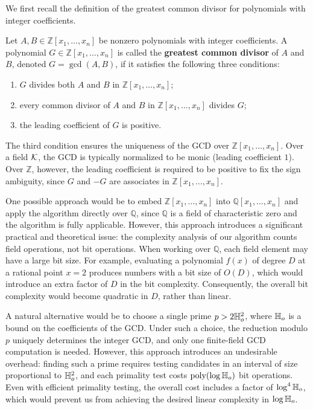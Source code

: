 \documentclass{article}
\numberwithin{equation}{section}
\begin{document}
We first recall the definition of the greatest common divisor for polynomials with integer coefficients.

\begin{definition}
Let $A, B \in \mathbb{Z}[x_1,\dots,x_n]$ be nonzero polynomials with integer coefficients. A polynomial $G \in \mathbb{Z}[x_1,\dots,x_n]$ is called the \textbf{greatest common divisor} of $A$ and $B$, denoted $G = \gcd(A,B)$, if it satisfies the following three conditions:

\begin{enumerate}
    \item $G$ divides both $A$ and $B$ in $\mathbb{Z}[x_1,\dots,x_n]$;
    \item every common divisor of $A$ and $B$ in $\mathbb{Z}[x_1,\dots,x_n]$ divides $G$;
    \item the leading coefficient of $G$ is positive.
\end{enumerate}
\end{definition}

\begin{remark}
The third condition ensures the uniqueness of the GCD over $\mathbb{Z}[x_1,\dots,x_n]$. Over a field ${\mathcal{K}}$, the GCD is typically normalized to be monic (leading coefficient $1$). Over $\mathbb{Z}$, however, the leading coefficient is required to be positive to fix the sign ambiguity, since $G$ and $-G$ are associates in $\mathbb{Z}[x_1,\dots,x_n]$.
\end{remark}

One possible approach would be to embed $\mathbb{Z}[x_1,\dots,x_n]$ into $\mathbb{Q}[x_1,\dots,x_n]$ and apply the algorithm directly over $\mathbb{Q}$, since $\mathbb{Q}$ is a field of characteristic zero and the algorithm is fully applicable. However, this approach introduces a significant practical and theoretical issue: the complexity analysis of our algorithm counts field operations, not bit operations. When working over $\mathbb{Q}$, each field element may have a large bit size. For example, evaluating a polynomial $f(x)$ of degree $D$ at a rational point $x = 2$ produces numbers with a bit size of $O(D)$, which would introduce an extra factor of $D$ in the bit complexity. Consequently, the overall bit complexity would become quadratic in $D$, rather than linear.




A natural alternative would be to choose a single prime \(p > 2\mathbb{H}_{o}^2\), where \(\mathbb{H}_{o}\) is a bound on the
coefficients of the GCD. Under such a choice, the reduction modulo \(p\) uniquely determines the integer
GCD, and only one finite-field GCD computation is needed. 
However, this approach introduces an undesirable overhead: finding such a prime requires testing candidates
in an interval of size proportional to \(\mathbb{H}_{o}^2\), and each primality test costs \(\operatorname{poly}(\log \mathbb{H}_{o})\)
bit operations. Even with efficient primality testing, the overall cost includes a factor of \(\log^4 \mathbb{H}_{o}\), which would prevent us from achieving the desired linear complexity in \(\log \mathbb{H}_{o}\).
\end{document}
